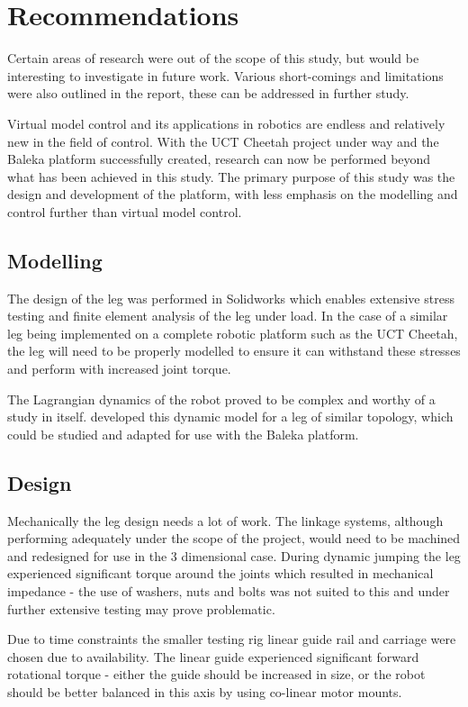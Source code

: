 \chapter{Recommendations}

Certain areas of research were out of the scope of this study, but would be interesting to investigate in future work. Various short-comings and limitations were also outlined in the report, these can be addressed in further study. 

Virtual model control and its applications in robotics are endless  and relatively new in the field of control. With the UCT Cheetah project under way and the Baleka platform successfully created, research can now be performed beyond what has been achieved in this study. The primary purpose of this study was the design and development of the platform, with less emphasis on the modelling and control further than virtual model control.

\section{Modelling}

The design of the leg was performed in Solidworks which enables extensive stress testing and finite element analysis of the leg under load. In the case of a similar leg being implemented on a complete robotic platform such as the UCT Cheetah, the leg will need to be properly modelled to ensure it can withstand these stresses and perform with increased joint torque.

The Lagrangian dynamics of the robot proved to be complex and worthy of a study in itself. \cite{Yu2006} developed this dynamic model for a leg of similar topology, which could be studied and adapted for use with the Baleka platform.

\section{Design}

Mechanically the leg design needs a lot of work. The linkage systems, although performing adequately under the scope of the project, would need to be machined and redesigned for use in the 3 dimensional case. During dynamic jumping the leg experienced significant torque around the joints which resulted in mechanical impedance - the use of washers, nuts and bolts was not suited to this and under further extensive testing may prove problematic.

Due to time constraints the smaller testing rig linear guide rail and carriage were chosen due to availability. The linear guide experienced significant forward rotational torque - either the guide should be increased in size, or the robot should be better balanced in this axis by using co-linear motor mounts.

